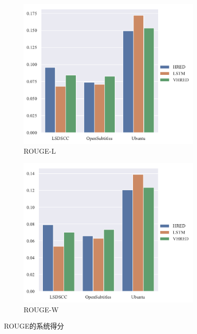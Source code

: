 \begin{figure}[H]
    \begin{subfigure}{0.4\linewidth}
        \centering
        \includegraphics[width=\linewidth]{figure/barplot/rouge_l/plot.pdf}
        \caption{ROUGE-L}
    \end{subfigure}%
    \begin{subfigure}{0.4\linewidth}
        \centering
        \includegraphics[width=\linewidth]{figure/barplot/rouge_w/plot.pdf}
        \caption{ROUGE-W}
    \end{subfigure}
    \centering
    \caption{ROUGE的系统得分}
    \label{fig:ROUGE_system}
\end{figure}
